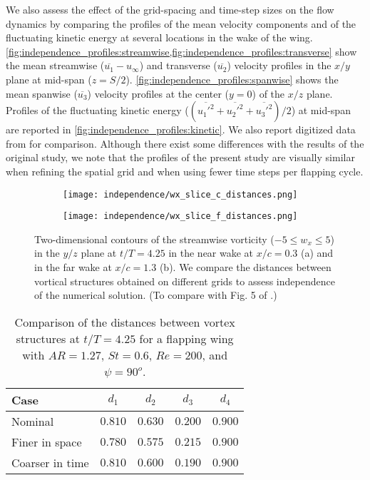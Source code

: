 We also assess the effect of the grid-spacing and time-step sizes on the flow dynamics by comparing the profiles of the mean velocity components and of the fluctuating kinetic energy at several locations in the wake of the wing.
\cref{fig:independence_profiles:streamwise,fig:independence_profiles:transverse} show the mean streamwise ($\overline{u_1} - u_\infty$) and transverse ($\overline{u_2}$) velocity profiles in the $x/y$ plane at mid-span ($z = S / 2$).
\cref{fig:independence_profiles:spanwise} shows the mean spanwise ($\overline{u_3}$) velocity profiles at the center ($y = 0$) of the $x/z$ plane.
Profiles of the fluctuating kinetic energy ($( \overline{{u_1'}^2} + \overline{{u_2'}^2} + \overline{{u_3'}^2} ) / 2$) at mid-span are reported in \cref{fig:independence_profiles:kinetic}.
We also report digitized data from \citet{li_dong_2016} for comparison.
Although there exist some differences with the results of the original study, we note that the profiles of the present study are visually similar when refining the spatial grid and when using fewer time steps per flapping cycle.

\begin{figure}[!h]
  \centering
  \begin{subfigure}[c]{0.35\textwidth}
    \centering
    \texttt{[image: independence/wx\_slice\_c\_distances.png]}
    \caption{}
  \end{subfigure}
  \hspace{1em}
  \begin{subfigure}[c]{0.35\textwidth}
    \centering
    \texttt{[image: independence/wx\_slice\_f\_distances.png]}
    \caption{}
  \end{subfigure}
  \caption{Two-dimensional contours of the streamwise vorticity ($-5 \leq w_x \leq 5$) in the $y/z$ plane at $t/T = 4.25$ in the near wake at $x / c = 0.3$ (a) and in the far wake at $x / c = 1.3$ (b). We compare the distances between vortical structures obtained on different grids to assess independence of the numerical solution. (To compare with Fig. 5 of \citet{li_dong_2016}.)}
  \label{fig:independence_wx_distances}
\end{figure}

\begin{table}[!h]
  \centering
  \begin{tabular}{lcccc}
    \hline\hline
    Case & $d_1$ & $d_2$ & $d_3$ & $d_4$ \\
    \hline
    Nominal & $0.810$ & $0.630$ & $0.200$ & $0.900$ \\
    Finer in space & $0.780$ & $0.575$ & $0.215$ & $0.900$ \\
    Coarser in time & $0.810$ & $0.600$ & $0.190$ & $0.900$ \\
    \hline\hline
  \end{tabular}
  \caption{Comparison of the distances between vortex structures at $t / T = 4.25$ for a flapping wing with $AR = 1.27$, $St = 0.6$, $Re = 200$, and $\psi = 90^o$.}
  \label{tab:independence_wx_distances}
\end{table}

